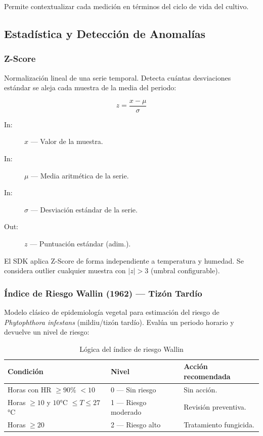 Permite contextualizar cada medición en términos del ciclo de vida del cultivo.

\subsection{Estadística y Detección de Anomalías}

\subsubsection{Z-Score}

Normalización lineal de una serie temporal. Detecta cuántas desviaciones estándar
se aleja cada muestra de la media del periodo:

\[
z = \frac{x - \mu}{\sigma}
\]

\begin{description}
        \item [In:] $x$ — Valor de la muestra.
    \item [In:] $\mu$ — Media aritmética de la serie.
    \item [In:] $\sigma$ — Desviación estándar de la serie.
    \item [Out:] $z$ — Puntuación estándar (adim.).
\end{description}

El SDK aplica Z-Score de forma independiente a temperatura y humedad.
Se considera outlier cualquier muestra con $|z| > 3$ (umbral configurable).

\subsubsection{Índice de Riesgo Wallin (1962) — Tizón Tardío}

Modelo clásico de epidemiología vegetal para estimación del riesgo de \textit{Phytophthora
infestans} (mildiu/tizón tardío). Evalúa un periodo horario y devuelve un nivel de riesgo:

\begin{table}[H]
    \centering
    \caption{Lógica del índice de riesgo Wallin}
    \begin{tabular}{lll}
        \toprule
        \textbf{Condición} & \textbf{Nivel} & \textbf{Acción recomendada} \\
        \midrule
        Horas con HR $\geq 90$\% $< 10$            & 0 — Sin riesgo     & Sin acción. \\
        Horas $\geq 10$ y $10$°C $\leq T \leq 27$°C & 1 — Riesgo moderado & Revisión preventiva. \\
        Horas $\geq 20$                              & 2 — Riesgo alto    & Tratamiento fungicida. \\
        \bottomrule
    \end{tabular}
\end{table}

